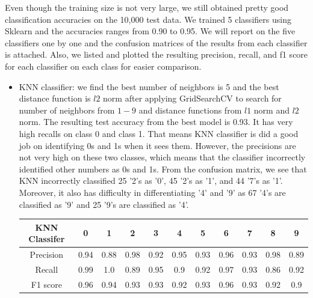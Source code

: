 \documentclass[twoside,10pt]{article}
\begin{document}
\begin{enumerate}
\begin{enumerate}
\begin{tcolorbox}
Even though the training size is not very large, we still obtained pretty good classification accuracies on the 10,000 test data. 
We trained 5 classifiers using Sklearn and the accuracies ranges from 0.90 to 0.95. We will report on the five classifiers one by one and the confusion matrices of the results from each classifier is attached. Also, we listed and plotted the resulting precision, recall, and f1 score for each classifier on each class for easier comparison. 
\begin{itemize}
\newpage
\item KNN classifier: we find the best number of neighbors is 5 and the best distance function is $l2$ norm after applying GridSearchCV to search for number of neighbors from $1-9$ and distance functions from $l1$ norm and $l2$ norm. The resulting test accuracy from the best model is 0.93. It has very high recalls on class 0 and class 1. That means KNN classifier is did a good job on identifying 0s and 1s when it sees them. However, the precisions are not very high on these two classes, which means that the classifier incorrectly identified other numbers as 0s and 1s. From the confusion matrix, we see that KNN incorrectly classified 25 '2's as '0', 45 '2's as '1', and 44 '7's as '1'. Moreover, it also has difficulty in differentiating '4' and '9' as 67 '4's are classified as '9' and 25 '9's are classified as '4'.
\begin{center}
\begin{tabular}{| c | c | c | c | c | c | c | c |  c | c | c |}
\hline
KNN Classifer &  0 & 1 & 2 & 3 & 4 & 5 &  6 & 7 & 8 &  9  \\
\hline
Precision &  0.94 &  0.88 &  0.98 &  0.92 &  0.95 &  0.93 &  0.96 &  0.93 &  0.98 &  0.89 \\
\hline
Recall &  0.99 &  1.0 &  0.89 &  0.95 &  0.9 &  0.92 &  0.97 &  0.93 &  0.86 &  0.92 \\
\hline
F1 score &  0.96 &  0.94 &  0.93 &  0.93 &  0.92 &  0.93 &  0.96 &  0.93 &  0.92 &  0.9 \\
\hline
\end{tabular} 


\end{center}
\end{itemize}
\end{tcolorbox}
\end{enumerate}
\end{enumerate}
\end{document}
